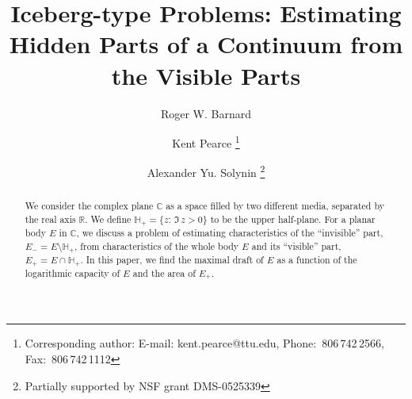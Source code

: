 \documentclass[mn,a4paper,fleqn]{w-art}
\begin{document}


\title[Iceberg-type Problems]{ Iceberg-type Problems: Estimating Hidden Parts of a Continuum from the Visible Parts}  %


\author[R.W. Barnard]{Roger W. Barnard}
\author[K. Pearce]{Kent Pearce
  \footnote{Corresponding author:  
  					E-mail: \scriptsize{\textsf{kent.pearce@ttu.edu}},
            Phone: \,806\,742\,2566,
            Fax: \,806\,742\,1112}}
\author[A.Y. Solynin]{Alexander Yu. Solynin
	\footnote{Partially supported by NSF grant DMS-0525339}}

\address{Department of Mathematics and Statistics,  Texas Tech
University, Box 41042, Lubbock, TX 79409}

\begin{abstract}{We consider the complex plane $\mathbb{C}$ as a space
filled by two different media, separated by the real axis
$\mathbb{R}$. We define $\mathbb{H}_+=\{z: \,\Im \,z>0\}$ to be the upper
half-plane. For a planar body $E$ in $\mathbb{C}$, we discuss a problem of 
estimating characteristics of the ``invisible'' part,
$E_-=E\setminus \mathbb{H}_+$, from characteristics of the whole
body $E$ and its ``visible'' part, $E_+=E\cap \mathbb{H}_+$. In this
paper, we find the maximal draft of $E$ as a function of the
logarithmic capacity of $E$ and the area of $E_+$.
 }
\end{abstract}


\maketitle
\end{document}
